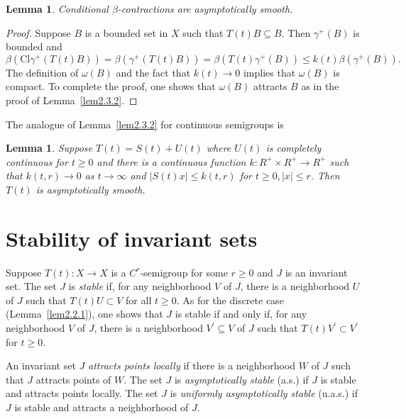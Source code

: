 \documentclass{surv-l}
\theoremstyle{plain}
\newtheorem{lemma}[theorem]{Lemma}
\theoremstyle{definition}
\numberwithin{equation}{section}
\numberwithin{figure}{chapter}
\begin{document}
\begin{lemma}\label{lem3.2.5} Conditional $\beta$-contractions are asymptotically smooth.\end{lemma}

\begin{proof} Suppose $B$ is a bounded set in $X$ such that $T(t)B\subseteq B$. Then $\gamma^{+}(B)$ is bounded and
\begin{equation*}
\beta(\mathrm{Cl}\gamma^{+}(T(t)B))=\beta(\gamma^{+}(T(t)B))=\beta(T(t)\gamma^{+}(B))\leq k(t)\beta(\gamma^{+}(B)).
\end{equation*}
The definition of $\omega(B)$ and the fact that $k(t)\rightarrow 0$ implies that $\omega(B)$ is compact. To complete the proof, one shows that $\omega(B)$ attracts $B$ as in the proof of Lemma~\ref{lem2.3.2}.
\end{proof}

The analogue of Lemma~\ref{lem2.3.2} for continuous semigroups is

\begin{lemma}\label{lem3.2.6} Suppose $T(t)=S(t)+U(t)$ where $U(t)$ is completely continuous for $t\geq 0$ and there is a continuous function $k\!:R^{+}\times R^{+}\rightarrow R^{+}$ such that $k(t, r)\rightarrow 0$ as $ t\rightarrow\infty$ and $|S(t)x|\leq k(t, r)$ for $t\geq 0, |x|\leq r$. Then $T(t)$ is asymptotically smooth.
\end{lemma}

\section{Stability of invariant sets}\label{sec3.3}

Suppose $T(t)\!:X\rightarrow X$ is a $C^{r}$-semigroup for some $r\geq 0$ and $J$ is an invariant set. The set $J$ is \emph{stable} if, for any neighborhood $V$ of $J$, there is a neighborhood $U$ of $J$ such that $T(t)U\subset V$ for all $t\geq 0$. As for the discrete case (Lemma~\ref{lem2.2.1}), one shows that $J$ is stable if and only if, for any neighborhood $V$ of $J$, there is a neighborhood $V^{\prime}\subseteq V$ of $J$ such that $T(t)V^{\prime}\subset V^{\prime}$ for $t\geq 0$.

An invariant set $J$ \emph{attracts points locally} if there is a neighborhood $W$ of $J$ such that $J$ attracts points of $W$. The set $J$ is \emph{asymptotically stable} (a.s.) if $J$ is stable and attracts points locally. The set $J$ is \emph{uniformly asymptotically stable} (u.a.s.) if $J$ is stable and attracts a neighborhood of $J$.
\end{document}

